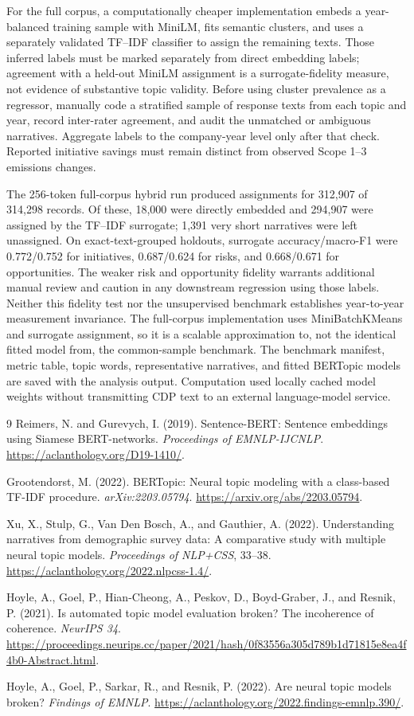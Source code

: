 \documentclass[11pt,a4paper]{article}
\begin{document}
For the full corpus, a computationally cheaper implementation embeds a
year-balanced training sample with MiniLM, fits semantic clusters, and uses
a separately validated TF--IDF classifier to assign the remaining texts.
Those inferred labels must be marked separately from direct embedding labels;
agreement with a held-out MiniLM assignment is a surrogate-fidelity measure,
not evidence of substantive topic validity. Before using cluster prevalence
as a regressor, manually code a stratified sample of response texts from
each topic and year, record inter-rater agreement, and audit the unmatched
or ambiguous narratives. Aggregate labels to the company-year level only
after that check. Reported initiative savings must remain distinct from
observed Scope 1--3 emissions changes.

The 256-token full-corpus hybrid run produced assignments for 312,907 of
314,298 records. Of these, 18,000 were directly embedded and 294,907 were
assigned by the TF--IDF surrogate; 1,391 very short narratives were left
unassigned. On exact-text-grouped holdouts, surrogate accuracy/macro-F1 were
0.772/0.752 for initiatives, 0.687/0.624 for risks, and 0.668/0.671 for
opportunities. The weaker risk and opportunity fidelity warrants additional
manual review and caution in any downstream regression using those labels.
Neither this fidelity test nor the unsupervised benchmark establishes
year-to-year measurement invariance. The full-corpus implementation uses
MiniBatchKMeans and surrogate assignment, so it is a scalable approximation
to, not the identical fitted model from, the common-sample benchmark.
The benchmark manifest, metric table, topic words, representative narratives,
and fitted BERTopic models are saved with the analysis output. Computation
used locally cached model weights without transmitting CDP text to an
external language-model service.

\begin{thebibliography}{9}
 Reimers, N. and Gurevych, I. (2019).
Sentence-BERT: Sentence embeddings using Siamese BERT-networks.
\emph{Proceedings of EMNLP-IJCNLP}.
\url{https://aclanthology.org/D19-1410/}.

 Grootendorst, M. (2022).
BERTopic: Neural topic modeling with a class-based TF-IDF procedure.
\emph{arXiv:2203.05794}.
\url{https://arxiv.org/abs/2203.05794}.

 Xu, X., Stulp, G., Van Den Bosch, A., and Gauthier, A. (2022).
Understanding narratives from demographic survey data: A comparative study
with multiple neural topic models. \emph{Proceedings of NLP+CSS}, 33--38.
\url{https://aclanthology.org/2022.nlpcss-1.4/}.

 Hoyle, A., Goel, P., Hian-Cheong, A., Peskov, D.,
Boyd-Graber, J., and Resnik, P. (2021).
Is automated topic model evaluation broken? The incoherence of coherence.
\emph{NeurIPS 34}.
\url{https://proceedings.neurips.cc/paper/2021/hash/0f83556a305d789b1d71815e8ea4f4b0-Abstract.html}.

 Hoyle, A., Goel, P., Sarkar, R., and Resnik, P. (2022).
Are neural topic models broken? \emph{Findings of EMNLP}.
\url{https://aclanthology.org/2022.findings-emnlp.390/}.
\end{thebibliography}
\end{document}
